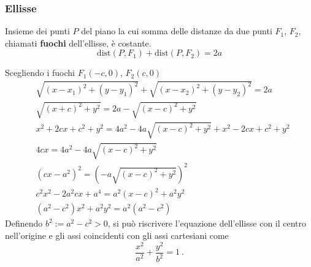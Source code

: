 \subsubsection{Ellisse}
\begin{definition}[Ellisse] Insieme dei punti $P$ del piano la cui somma delle distanze da due punti $F_1$, $F_2$, chiamati \textbf{fuochi} dell'ellisse, è costante.
    \begin{equation}
        \text{dist}(P, F_1) + \text{dist}(P, F_2) = 2a
    \end{equation}
\end{definition}
Scegliendo i fuochi $F_1(-c,0)$, $F_2(c,0)$
\begin{equation}
\begin{aligned}
    & \sqrt{( x - x_1 )^2 + (y-y_1)^2} + \sqrt{(x-x_2)^2 + (y-y_2)^2} = 2a \\
    & \sqrt{( x + c )^2 + y^2} = 2a - \sqrt{(x-c)^2 + y^2} \\
    & x^2 + 2 c x + c^2 + y^2  = 4a^2 - 4 a \sqrt{(x-c)^2 + y^2} +
    x^2 - 2 c x + c^2 + y^2 \\
    & 4c x = 4a^2 - 4a  \sqrt{(x-c)^2 + y^2} \\
    & (cx - a^2)^2 = ( - a  \sqrt{(x-c)^2 + y^2})^2 \\
    & c^2x^2 - 2a^2cx + a^4 = a^2(x-c)^2 + a^2 y^2 \\
    & (a^2-c^2) x^2 + a^2y^2 = a^2 (a^2-c^2) 
\end{aligned}
\end{equation}
Definendo $b^2 := a^2 - c^2 > 0$, si può riscrivere l'equazione dell'ellisse con il centro nell'origine e gli assi coincidenti con gli assi cartesiani come
\begin{equation}
  \dfrac{x^2}{a^2} + \dfrac{y^2}{b^2} = 1 \ .
\end{equation}

